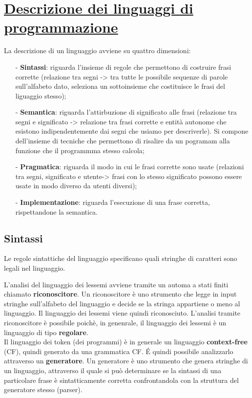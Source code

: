\documentclass[a4paper, 10pt]{report}
\begin{document}
\section*{\underline{Descrizione dei linguaggi di programmazione}}
La  descrizione  di  un  linguaggio  avviene  su  quattro  dimensioni:
\begin{itemize}
\item[-] \textbf{Sintassi}: riguarda l’insieme di regole che permettono di costruire frasi corrette (relazione tra segni -> tra tutte le possibile sequenze di parole sull'alfabeto dato, seleziona un sottoinsieme che costituisce le frasi del liguaggio stesso);
\item[-] \textbf{Semantica}: riguarda l'attirbuzione di significato alle frasi (relazione tra segni e significato -> relazione tra frasi corrette e entità autonome che esistono indipendentemente dai segni che usiamo per descriverle). Si compone dell'insieme di tecniche che permettono di risalire da un pogramam alla funzione che il programmma stesso calcola;
\item[-] \textbf{Pragmatica}: riguarda il modo in cui le frasi corrette sono usate (relazioni tra segni, significato e utente-> frasi con lo stesso significato possono essere usate in modo diverso da utenti diversi);
\item[-] \textbf{Implementazione}: riguarda l'esecuzione di una frase corretta, rispettandone la semantica.
\end{itemize}

\subsection*{Sintassi}
Le   regole   sintattiche   del   linguaggio   specificano   quali stringhe di caratteri sono legali nel linguaggio.

\noindent L'analisi del linguaggio dei lessemi avviene tramite un automa a stati finiti chiamato \textbf{riconoscitore}. 
Un riconoscitore  è uno strumento che legge in input stringhe sull’alfabeto del linguaggio e decide se la stringa appartiene o meno al linguaggio. Il linguaggio dei lessemi viene quindi riconosciuto.
L'analisi tramite riconoscitore è possibile poichè, in genenrale, il linguaggio dei lessemi è un linguaggio di tipo \textbf{regolare}.\\

\noindent  Il linguaggio dei token (dei programmi) è in generale   un   linguaggio \textbf{context-free}   (CF),   quindi generato da una grammatica CF. 
É quindi possibile analizzarlo attraverso un \textbf{generatore}.
Un generatore è uno strumento che genera stringhe di un linguaggio, attraverso il quale si può determinare se la sintassi di una particolare frase è sintatticamente corretta confrontandola con la struttura del generatore stesso (parser).\\
\end{document}

